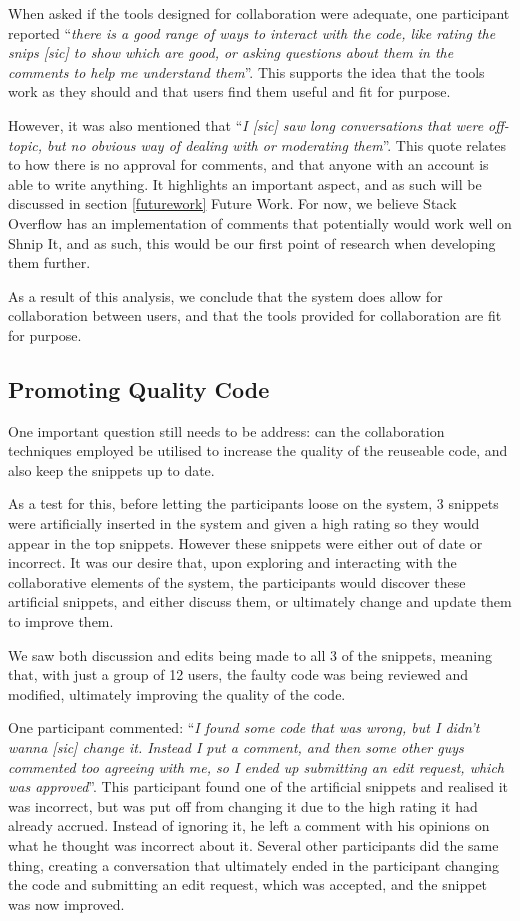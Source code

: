 When asked if the tools designed for collaboration were adequate, one participant reported ``\textit{there is a good range of ways to interact with the code, like rating the snips [sic] to show which are good, or asking questions about them in the comments to help me understand them}''. 
This supports the idea that the tools work as they should and that users find them useful and fit for purpose. 

However, it was also mentioned that ``\textit{I [sic] saw long conversations that were off-topic, but no obvious way of dealing with or moderating them}''. 
This quote relates to how there is no approval for comments, and that anyone with an account is able to write anything.
It highlights an important aspect, and as such will be discussed in section \ref{futurework} Future Work.
For now, we believe Stack Overflow has an implementation of comments that potentially would work well on Shnip It, and as such, this would be our first point of research when developing them further.

As a result of this analysis, we conclude that the system does allow for collaboration between users, and that the tools provided for collaboration are fit for purpose.

\subsection{Promoting Quality Code}
One important question still needs to be address: can the collaboration techniques employed be utilised to increase the quality of the reuseable code, and also keep the snippets up to date.

As a test for this, before letting the participants loose on the system, 3 snippets were artificially inserted in the system and given a high rating so they would appear in the top snippets.
However these snippets were either out of date or incorrect.
It was our desire that, upon exploring and interacting with the collaborative elements of the system, the participants would discover these artificial snippets, and either discuss them, or ultimately change and update them to improve them.

We saw both discussion and edits being made to all 3 of the snippets, meaning that, with just a group of 12 users, the faulty code was being reviewed and modified, ultimately improving the quality of the code.

One participant commented: ``\textit{I found some code that was wrong, but I didn't wanna [sic] change it. Instead I put a comment, and then some other guys commented too agreeing with me, so I ended up submitting an edit request, which was approved}''.
This participant found one of the artificial snippets and realised it was incorrect, but was put off from changing it due to the high rating it had already accrued. 
Instead of ignoring it, he left a comment with his opinions on what he thought was incorrect about it.
Several other participants did the same thing, creating a conversation that ultimately ended in the participant changing the code and submitting an edit request, which was accepted, and the snippet was now improved.

